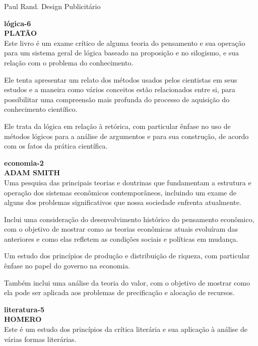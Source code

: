 \documentclass[a4paper]{article}
\begin{document}
\vspace{2em} %

Paul Rand. Design Publicitário

\vspace{3em} %

\textbf{lógica-6} \\
\textbf{PLATÃO} \\
\small
Este livro é um exame crítico de alguma teoria do pensamento e sua operação para um sistema geral de lógica baseado na proposição e no silogismo, e sua relação com o problema do conhecimento.

Ele tenta apresentar um relato dos métodos usados pelos cientistas em seus estudos e a maneira como vários conceitos estão relacionados entre si, para possibilitar uma compreensão mais profunda do processo de aquisição do conhecimento científico.

Ele trata da lógica em relação à retórica, com particular ênfase no uso de métodos lógicos para a análise de argumentos e para sua construção, de acordo com os fatos da prática científica.
\normalsize

\vspace{1.5em} %

\textbf{economia-2} \\
\textbf{ADAM SMITH} \\
\small
Uma pesquisa das principais teorias e doutrinas que fundamentam a estrutura e operação dos sistemas econômicos contemporâneos, incluindo um exame de alguns dos problemas significativos que nossa sociedade enfrenta atualmente.

Inclui uma consideração do desenvolvimento histórico do pensamento econômico, com o objetivo de mostrar como as teorias econômicas atuais evoluíram das anteriores e como elas refletem as condições sociais e políticas em mudança.

Um estudo dos princípios de produção e distribuição de riqueza, com particular ênfase no papel do governo na economia.

Também inclui uma análise da teoria do valor, com o objetivo de mostrar como ela pode ser aplicada aos problemas de precificação e alocação de recursos.
\normalsize

\vspace{1.5em}

\textbf{literatura-5} \\
\textbf{HOMERO} \\
\small
Este é um estudo dos princípios da crítica literária e sua aplicação à análise de várias formas literárias.
\end{document}
